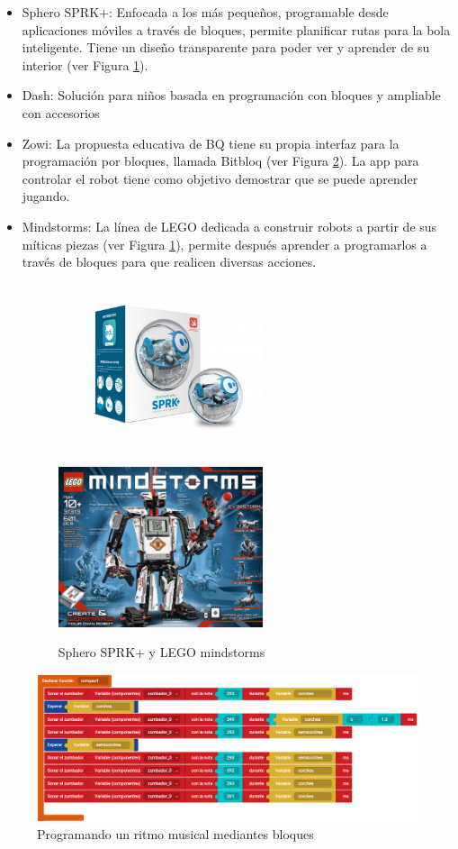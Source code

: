 \documentclass[12pt,spanish,chapterprefix, numbers=noenddot]{book}
\numberwithin{equation}{section}
\numberwithin{figure}{section}
\begin{document}
\begin{itemize}
    \item Sphero SPRK+: Enfocada a los más pequeños, programable desde aplicaciones móviles a través de bloques, permite planificar rutas para la bola inteligente. Tiene un diseño transparente para poder ver y aprender de su interior (ver Figura \ref{fig:sphero}).  
    \item Dash: Solución para niños basada en programación con bloques y ampliable con accesorios 
    \item Zowi: La propuesta educativa de BQ tiene su propia interfaz para la programación por bloques, llamada Bitbloq (ver Figura \ref{fig:bitbloq}). La app para controlar el robot tiene como objetivo demostrar que se puede aprender jugando.
    \item Mindstorms: La línea de LEGO dedicada a construir robots a partir de sus míticas piezas (ver Figura \ref{fig:sphero}), permite después aprender a programarlos a través de bloques para que realicen diversas acciones. 
    \begin{figure}[h!]
    \centering
    \includegraphics[width=6cm]{Figs/spheroedu-sprkplus.png}
    \includegraphics[width=6cm]{Figs/mindstorms.jpg}
    \par
    \caption{\label{fig:sphero}Sphero SPRK+ y LEGO mindstorms}
    \end{figure}
\end{itemize}

    \begin{figure}[h!]
    \centering
    \includegraphics[width=14cm]{Figs/compas_bitbloq.png}
    \par
    \caption{\label{fig:bitbloq}Programando un ritmo musical mediantes bloques}
    \end{figure}
\end{document}
